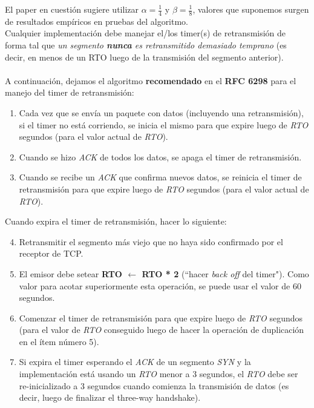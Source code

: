 \indent El paper en cuestión sugiere utilizar $\alpha = \frac{1}{4} $ y $\beta = \frac{1}{8}$, valores que suponemos surgen de resultados empíricos en pruebas del algoritmo.\\

\indent Cualquier implementación debe manejar el/los timer(s) de retransmisión
de forma tal que \textit{un segmento \textbf{nunca} es retransmitido demasiado
temprano} (es decir, en menos de un RTO luego de la transmisión del segmento
anterior).\\
\\
\indent A continuación, dejamos el algoritmo \textbf{recomendado} en el
\textbf{RFC 6298} para el manejo del timer de retransmisión:
\begin{enumerate}
 \item Cada vez que se envía un paquete con datos (incluyendo una
	retransmisión), si el timer no está corriendo, se inicia el mismo para
	que expire luego de \textit{RTO} segundos (para el valor actual de
	\textit{RTO}).
 \item Cuando se hizo \textit{ACK} de todos los datos, se apaga el timer de
	retransmisión.
 \item Cuando se recibe un \textit{ACK} que confirma nuevos datos, se reinicia
	el timer de retransmisión para que expire luego de \textit{RTO}
	segundos (para el valor actual de \textit{RTO}).
\end{enumerate}
Cuando expira el timer de retransmisión, hacer lo siguiente:
\begin{enumerate}
 \setcounter{enumi}{3}
 \item Retransmitir el segmento más viejo que no haya sido confirmado
	por el receptor de TCP.
 \item El emisor debe setear \textbf{RTO $\leftarrow$ RTO * 2} (``hacer
	\textit{back off} del timer"). Como valor para acotar superiormente
	esta operación, se puede usar el valor de 60 segundos.
 \item Comenzar el timer de retransmisión para que expire luego de \textit{RTO}
	segundos (para el valor de \textit{RTO} conseguido luego de hacer la
	operación de duplicación en el ítem número 5).
 \item Si expira el timer esperando el \textit{ACK} de un segmento \textit{SYN}
	y la implementación está usando un \textit{RTO} menor a 3 segundos, el
	\textit{RTO} debe ser re-inicializado a 3 segundos cuando comienza la
	transmisión de datos (es decir, luego de finalizar el three-way 
handshake).
\end{enumerate}

